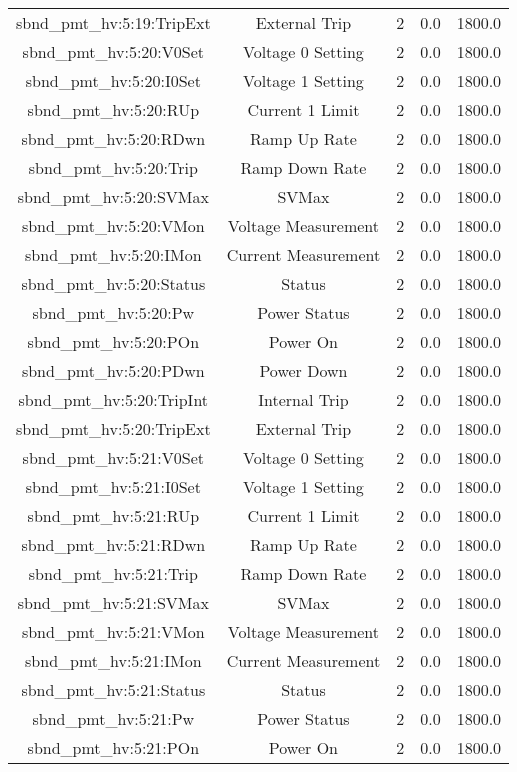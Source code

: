 \begin{table}[ptb]
\begin{tabular}{c | c c c c}
sbnd_pmt_hv:5:19:TripExt & External Trip & 2 & 0.0 & 1800.0\\ 
sbnd_pmt_hv:5:20:V0Set & Voltage 0 Setting & 2 & 0.0 & 1800.0\\ 
sbnd_pmt_hv:5:20:I0Set & Voltage 1 Setting & 2 & 0.0 & 1800.0\\ 
sbnd_pmt_hv:5:20:RUp & Current 1 Limit & 2 & 0.0 & 1800.0\\ 
sbnd_pmt_hv:5:20:RDwn & Ramp Up Rate & 2 & 0.0 & 1800.0\\ 
sbnd_pmt_hv:5:20:Trip & Ramp Down Rate & 2 & 0.0 & 1800.0\\ 
sbnd_pmt_hv:5:20:SVMax & SVMax & 2 & 0.0 & 1800.0\\ 
sbnd_pmt_hv:5:20:VMon & Voltage Measurement & 2 & 0.0 & 1800.0\\ 
sbnd_pmt_hv:5:20:IMon & Current Measurement & 2 & 0.0 & 1800.0\\ 
sbnd_pmt_hv:5:20:Status & Status & 2 & 0.0 & 1800.0\\ 
sbnd_pmt_hv:5:20:Pw & Power Status & 2 & 0.0 & 1800.0\\ 
sbnd_pmt_hv:5:20:POn & Power On & 2 & 0.0 & 1800.0\\ 
sbnd_pmt_hv:5:20:PDwn & Power Down & 2 & 0.0 & 1800.0\\ 
sbnd_pmt_hv:5:20:TripInt & Internal Trip & 2 & 0.0 & 1800.0\\ 
sbnd_pmt_hv:5:20:TripExt & External Trip & 2 & 0.0 & 1800.0\\ 
sbnd_pmt_hv:5:21:V0Set & Voltage 0 Setting & 2 & 0.0 & 1800.0\\ 
sbnd_pmt_hv:5:21:I0Set & Voltage 1 Setting & 2 & 0.0 & 1800.0\\ 
sbnd_pmt_hv:5:21:RUp & Current 1 Limit & 2 & 0.0 & 1800.0\\ 
sbnd_pmt_hv:5:21:RDwn & Ramp Up Rate & 2 & 0.0 & 1800.0\\ 
sbnd_pmt_hv:5:21:Trip & Ramp Down Rate & 2 & 0.0 & 1800.0\\ 
sbnd_pmt_hv:5:21:SVMax & SVMax & 2 & 0.0 & 1800.0\\ 
sbnd_pmt_hv:5:21:VMon & Voltage Measurement & 2 & 0.0 & 1800.0\\ 
sbnd_pmt_hv:5:21:IMon & Current Measurement & 2 & 0.0 & 1800.0\\ 
sbnd_pmt_hv:5:21:Status & Status & 2 & 0.0 & 1800.0\\ 
sbnd_pmt_hv:5:21:Pw & Power Status & 2 & 0.0 & 1800.0\\ 
sbnd_pmt_hv:5:21:POn & Power On & 2 & 0.0 & 1800.0\\ 

\end{tabular}
\end{table}
